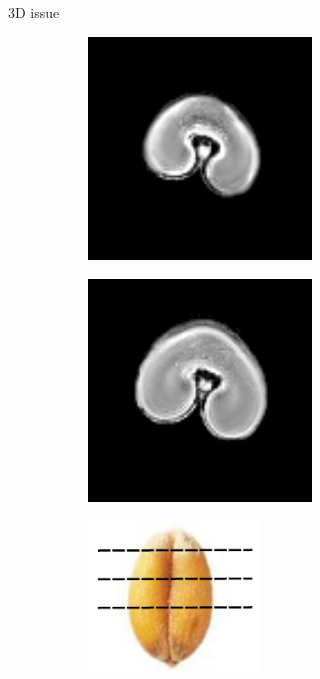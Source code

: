 \documentclass[10pt]{beamer}
\begin{document}
\begin{frame}{3D issue}
\begin{figure}[ht]
\begin{subfigure}[c]{0.3\textwidth}
       \includegraphics[width=0.65\textwidth]{fig/3D_density_aligned_manual0003}%
     \end{subfigure}%
     \begin{subfigure}[c]{0.3\textwidth}
       \centering
       \includegraphics[width=0.65\textwidth]{fig/3D_density_aligned_manual0006}%
     \end{subfigure}
     \begin{subfigure}[b]{0.15\textwidth}
       \includegraphics[width=0.5\textwidth]{fig/cutwheatgrain}

\end{subfigure}
\end{figure}
\end{frame}
\end{document}
